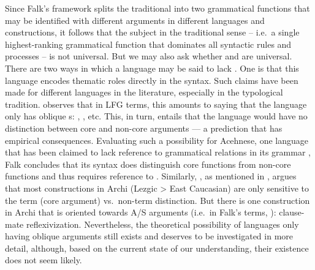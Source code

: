 \documentclass[output=paper]{../langscibook}
\begin{document}
 Since Falk's framework splits the traditional \SUBJ into two grammatical functions that may be identified with different arguments in different languages and constructions, it follows that the subject in the traditional sense -- i.e.\ a single highest-ranking grammatical function that dominates all syntactic rules and processes -- is not universal. But we may also ask whether \GFHAT and \PIVOT are universal. There are two ways in which a language may be said to lack \GFHAT. One is that this language encodes thematic roles directly in the syntax. Such claims have been made for different languages in the literature, especially in the typological tradition. \citet[169]{falk06} observes that in LFG terms, this amounts to saying that the language only has oblique {\GF}s: {}, {}, etc. This, in turn, entails that the language would have no distinction between core and non-core arguments --- a prediction that has empirical consequences. Evaluating such a possibility for Acehnese, one language that has been claimed to lack reference to grammatical relations in its grammar \citep{VanValin1997}, Falk concludes that its syntax does distinguish core functions from non-core functions and thus requires reference to \GFHAT. Similarly, \citet{kibrik2000}, as mentioned in , argues that most constructions in Archi (Lezgic > East Caucasian) are only sensitive to the term (core argument) vs.\ non-term distinction. But there is one construction in Archi that is oriented towards A/S arguments (i.e.\ in Falk's terms, \GFHAT): clause-mate reflexivization. Nevertheless, the theoretical possibility of languages only having oblique arguments still exists and deserves to be investigated in more detail, although, based on the current state of our understanding, their existence does not seem likely.
 
\end{document}
